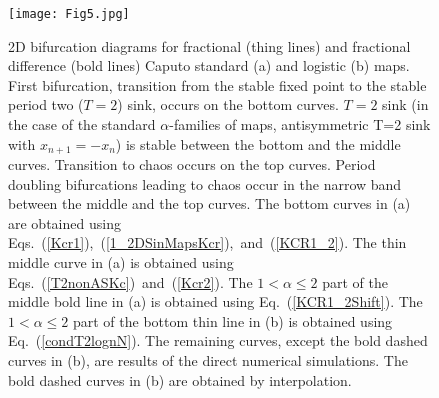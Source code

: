 \documentclass[graybox]{svmult}
\begin{document}
\begin{figure}[!t]
\begin{center}
\texttt{[image: Fig5.jpg]}
\vspace{-0.25cm}
\caption{
2D bifurcation diagrams for fractional (thing lines) and
fractional difference (bold lines) Caputo standard (a) 
and logistic (b) maps. First bifurcation, transition from the stable fixed 
point to the stable period two ($T=2$) sink, 
occurs on the bottom curves.
$T=2$ sink (in the case of the standard $\alpha$-families of maps,
antisymmetric T=2 sink with $x_{n+1}=-x_n$)
is stable between the bottom and the middle curves. Transition 
to chaos occurs on the top curves. Period doubling bifurcations leading to chaos occur in the narrow band between the middle and the top curves.
The bottom curves in (a) are obtained using 
Eqs.~(\ref{Kcr1}),~(\ref{1_2DSinMapsKcr}),~and~(\ref{KCR1_2}).
The thin middle curve in (a) is obtained using 
Eqs.~(\ref{T2nonASKc})~and~(\ref{Kcr2}).
The $1 < \alpha \le 2$ part of the middle bold line in (a) is obtained using Eq.~(\ref{KCR1_2Shift}).
The $1 < \alpha \le 2$ part of the bottom thin line in (b) is obtained using Eq.~(\ref{condT2lognN}).
The remaining curves, except the bold dashed curves in (b), are results of the direct numerical simulations. The bold dashed curves in (b) are obtained by interpolation. 
}
\end{center}
\label{BD2d}
\end{figure} 
\end{document}

